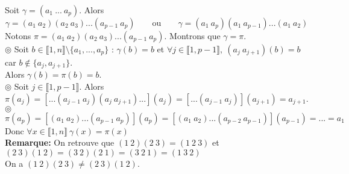 \documentclass[11pt]{article}
\newcommand*{\lb}{\llbracket}
\newcommand*{\rb}{\rrbracket}
\newcommand*{\n}{\\[0.2cm]}
\newcommand{\0}{\varnothing}
\newcommand*{\g}{\gamma}
\begin{document}
\begin{prop}{}{}
    Soit $\g=(a_1~...~a_p)$. Alors
    \begin{equation*}
        \g=(a_1~a_2)(a_2~a_3)...(a_{p-1}~a_p) \qquad \text{ou} \qquad \g=(a_1~a_p)(a_1~a_{p-1})...(a_1~a_2)
    \end{equation*}
    \tcblower
    Notons $\pi=(a_1~a_2)(a_2~a_3)...(a_{p-1}~a_p)$. Montrons que $\g=\pi$.\\
    $\circledcirc$ Soit $b\in\lb1,n\rb\setminus\{a_1,...,a_p\}$ : $\g(b)=b$ et $\forall j \in \lb1,p-1\rb, ~ (a_j~a_{j+1})(b)=b$ car $b\notin\{a_j,a_{j+1}\}$.\\
    Alors $\gamma(b)=\pi(b)=b$.\\
    $\circledcirc$ Soit $j\in\lb1,p-1\rb$. Alors $\pi(a_j)=\left[...(a_{j-1}~a_j)(a_j~a_{j+1})...\right](a_j)=\left[...(a_{j-1}~a_j)\right](a_{j+1})=a_{j+1}$.\\
    $\circledcirc$ $\pi(a_p)=[(a_1~a_2)...(a_{p-1}~a_p)](a_p)=[(a_1~a_2)...(a_{p-2}~a_{p-1})](a_{p-1})=...=a_1$\\
    Donc $\forall x \in \lb1,n\rb ~ \g(x)=\pi(x)$\n
    \textbf{Remarque:} On retrouve que $(1~2)(2~3)=(1~2~3)$ et $(2~3)(1~2) = (3~2)(2~1)=(3~2~1)=(1~3~2)$\\
    On a $(1~2)(2~3)\neq(2~3)(1~2)$.
\end{prop}
\end{document}
